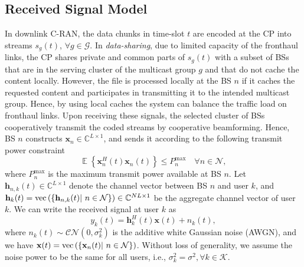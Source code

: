 \documentclass[12pt,draftcls,onecolumn]{IEEEtran}
\theoremstyle{remark}
\DeclareMathOperator{\EX}{\mathbb{E}}%
\theoremstyle{definition}
\begin{document}
 \subsection{Received Signal Model}
 In downlink C-RAN, the data chunks in time-slot $t$ are encoded at the CP into streams $s_g(t)$, $\forall g\in \mathcal{G}$.
 In \emph{data-sharing}, due to limited capacity of the fronthaul links, the CP shares private and common parts of $s_g(t)$ with a subset of BSs that are in the serving cluster of the multicast group $g$ and that do not cache the content locally. However,  the file is processed locally at the BS $n$ if it caches the requested content and participates in transmitting it to the intended multicast group. Hence, by using local caches the system can balance the traffic load on fronthaul links. Upon receiving these signals, the selected cluster of BSs cooperatively transmit the coded streams by cooperative beamforming. Hence, BS $n$ constructs $\mathbf{x}_{n} \in \mathbb{C}^{L\times1}$, and sends it according to the following transmit power constraint
 \begin{equation}\label{eq:e1}
 \EX\left\lbrace \mathbf{x}_{n}^{H}(t)\mathbf{x}_{n}(t)\right\rbrace \leq P_{n}^{\text{max}} \quad \forall n \in \mathcal{N},
 \end{equation}
 where $P_{n}^{\text{max}}$ is the maximum transmit power available at BS $n$.
 Let $\mathbf{h}_{n, k}(t) \in \mathbb{C}^{L\times1}$ denote the channel vector between BS $n$ and user $k$, and $\mathbf{h}_k(t) = {\rm vec}\left(\left\{\mathbf{h}_{n, k}(t)|\,\, n \in \mathcal{N}\right\}\right)  \in \mathbb{C}^{NL \times 1}$ be the aggregate channel vector of user $k$. We can write the received signal at user $k$ as 
 \begin{equation}\label{eq:e2}
 y_k(t) = \mathbf{h}_{k}^H(t) \mathbf{x}(t) + n_k(t),
 \end{equation}
 where $n_k(t) \sim \mathcal{CN}\left(0, \sigma_k^2\right)$ is the additive white Gaussian noise (AWGN), and we have $\mathbf{x}(t) = {\rm vec}\left(\left\{ \mathbf{x}_{n}(t)| \,\, n \in \mathcal{N} \right\}\right)$. Without loss of generality, we assume the noise power to be the same for all users, i.e., $\sigma_k^2 = \sigma^2, \forall k \in \mathcal{K}$. 
\end{document}
